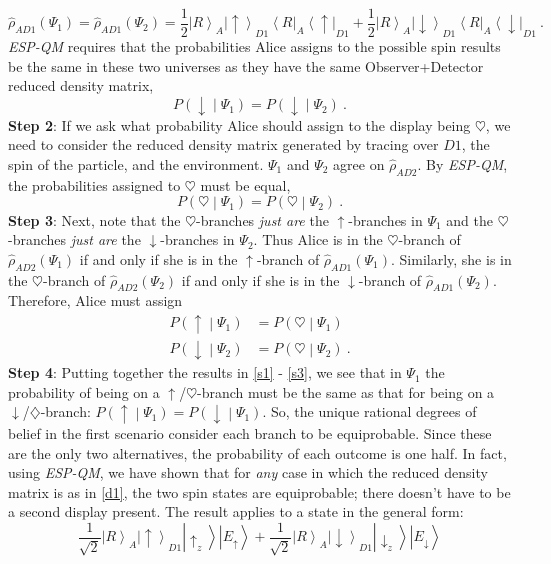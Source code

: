 \documentclass[onecolumn,secnumarabic,amsmath,amssymb,balancelastpage,nofootinbib]{article}
\newcommand{\bra}[1]{\ensuremath{\left\langle#1\right|}}
\newcommand{\ket}[1]{\ensuremath{\left|#1\right\rangle}}
\begin{document}
\begin{equation}
\widehat{\rho}_{AD1}\left(\Psi_1\right)=\widehat{\rho}_{AD1}\left(\Psi_2\right)=\frac{1}{2}\ket{R}_A\ket{\uparrow}_{D1}\bra{R}_A\bra{\uparrow}_{D1}+\frac{1}{2}\ket{R}_A\ket{\downarrow}_{D1}\bra{R}_A\bra{\downarrow}_{D1}\ .
\label{d1}
\end{equation}
\emph{ESP-QM} requires that the probabilities Alice assigns to the possible spin results be the same in these two universes as they have the same Observer+Detector reduced density matrix,
\begin{equation}
P\left(\downarrow\middle|\Psi_1\right)=P\left(\downarrow\middle|\Psi_2\right)\ .
\label{s1}
\end{equation}
\textbf{Step 2}: If we ask what probability Alice should assign to the display being $\heartsuit$, we need to consider the reduced density matrix generated by tracing over $D1$, the spin of the particle, and the environment.  $\Psi_1$ and $\Psi_2$ agree on $\widehat{\rho}_{AD2}$.  By \emph{ESP-QM}, the probabilities assigned to $\heartsuit$ must be equal,
\begin{equation}
P\left(\heartsuit\middle|\Psi_1\right)=P\left(\heartsuit\middle|\Psi_2\right)\ .
\label{s2}
\end{equation}
\textbf{Step 3}: Next, note that the $\heartsuit$-branches \textit{just are} the $\uparrow$-branches in $\Psi_1$ and the $\heartsuit$-branches \textit{just are} the $\downarrow$-branches in $\Psi_2$.  Thus Alice is in the $\heartsuit$-branch of $\widehat{\rho}_{AD2}(\Psi_1)$ if and only if she is in the $\uparrow$-branch of $\widehat{\rho}_{AD1}(\Psi_1)$.  Similarly, she is in the $\heartsuit$-branch of $\widehat{\rho}_{AD2}(\Psi_2)$ if and only if she is in the $\downarrow$-branch of $\widehat{\rho}_{AD1}(\Psi_2)$.   Therefore, Alice must assign
\begin{align}
P\left(\uparrow\middle|\Psi_1\right)&=P\left(\heartsuit\middle|\Psi_1\right)
\nonumber
\\
P\left(\downarrow\middle|\Psi_2\right)&=P\left(\heartsuit\middle|\Psi_2\right)\ .
\label{s3}
\end{align}
\textbf{Step 4}:  Putting together the results in \eqref{s1} - \eqref{s3}, we see that in $\Psi_1$ the probability of being on a $\uparrow$/$\heartsuit$-branch must be the same as that for being on a $\downarrow$/$\diamondsuit$-branch: $P\left(\uparrow\middle|\Psi_1\right)=P\left(\downarrow\middle|\Psi_1\right)$.  So, the unique rational degrees of belief in the first scenario consider each branch to be equiprobable.  Since these are the only two alternatives, the probability of each outcome is one half.  In fact, using \emph{ESP-QM}, we have shown that for \textit{any} case in which the reduced density matrix is as in \eqref{d1}, the two spin states are equiprobable; there doesn't have to be a second display present.  The result applies to a state in the general form:
\begin{equation}
\frac{1}{\sqrt{2}}\ket{R}_A\ket{\uparrow}_{D1}\ket{\uparrow_z}\ket{E_{\uparrow}}+\frac{1}{\sqrt{2}}\ket{R}_A\ket{\downarrow}_{D1}\ket{\downarrow_z}\ket{E_\downarrow}
\label{general5050}
\end{equation}
\end{document}
